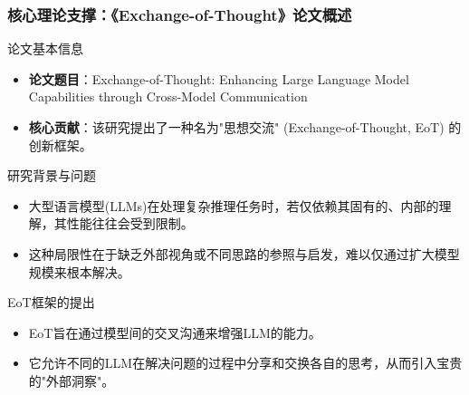 \documentclass[aspectratio=169]{beamer} %
\begin{document}
\begin{frame}[allowframebreaks]
\frametitle{核心理论支撑：《Exchange-of-Thought》论文概述}
\begin{block}{论文基本信息}
    \begin{itemize}
        \item \textbf{论文题目}：Exchange-of-Thought: Enhancing Large Language Model Capabilities through Cross-Model Communication
        \item \textbf{核心贡献}：该研究提出了一种名为"思想交流" (Exchange-of-Thought, EoT) 的创新框架。
    \end{itemize}
\end{block}

\begin{block}{研究背景与问题}
    \begin{itemize}
        \item 大型语言模型(LLMs)在处理复杂推理任务时，若仅依赖其固有的、内部的理解，其性能往往会受到限制。
        \item 这种局限性在于缺乏外部视角或不同思路的参照与启发，难以仅通过扩大模型规模来根本解决。
    \end{itemize}
\end{block}

\begin{block}{EoT框架的提出}
    \begin{itemize}
        \item EoT旨在通过模型间的交叉沟通来增强LLM的能力。
        \item 它允许不同的LLM在解决问题的过程中分享和交换各自的思考，从而引入宝贵的"外部洞察"。
    \end{itemize}
\end{block}
\end{frame}
\end{document}
